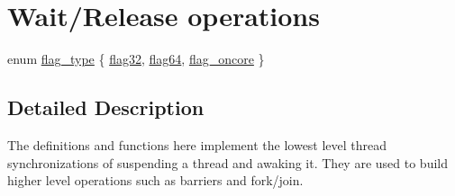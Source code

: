 \hypertarget{group__WAIT__RELEASE}{\section{Wait/\-Release operations}
\label{group__WAIT__RELEASE}
}
\begin{DoxyCompactItemize}
\item 
enum \hyperlink{group__WAIT__RELEASE_ga507a7197646f995b5529a68c1481e39b}{flag\-\_\-type} \{ \hyperlink{group__WAIT__RELEASE_gga507a7197646f995b5529a68c1481e39baa8e37e16d043d78e34da1d19387be5ba}{flag32}, 
\hyperlink{group__WAIT__RELEASE_gga507a7197646f995b5529a68c1481e39ba8b02d824728fb546d43123b8b069ed04}{flag64}, 
\hyperlink{group__WAIT__RELEASE_gga507a7197646f995b5529a68c1481e39ba9e8f1573ea73441426c6a6dda73b4e49}{flag\-\_\-oncore}
 \}
\end{DoxyCompactItemize}


\subsection{Detailed Description}
The definitions and functions here implement the lowest level thread synchronizations of suspending a thread and awaking it. They are used to build higher level operations such as barriers and fork/join. 

